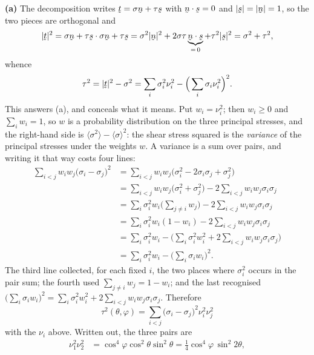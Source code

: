\begin{solution}
\medskip
\noindent\textbf{(a)}
The decomposition  writes $\bt=\sigma\bn+\tau\bs$ with
$\ip\bn\bs=0$ and $|\bs|=|\bn|=1$, so the two pieces are orthogonal and
\[
   |\bt|^{2}=\ip{\sigma\bn+\tau\bs}{\sigma\bn+\tau\bs}
   =\sigma^{2}|\bn|^{2}+2\sigma\tau\underbrace{\ip\bn\bs}_{=\,0}
     +\tau^{2}|\bs|^{2}
   =\sigma^{2}+\tau^{2} ,
\]
whence
\[
   \tau^{2}=|\bt|^{2}-\sigma^{2}
   =\sum_{i}\sigma_{i}^{2}\nu_{i}^{2}
    -\Big(\sum_{i}\sigma_{i}\nu_{i}^{2}\Big)^{2}.
\]
This answers (a), and conceals what it means. Put $w_{i}=\nu_{i}^{2}$;
then $w_{i}\geq0$ and $\sum_{i}w_{i}=1$, so $w$ is a probability
distribution on the three principal stresses, and the right-hand side
is $\langle\sigma^{2}\rangle-\langle\sigma\rangle^{2}$: the shear
stress squared is the \emph{variance} of the principal stresses under
the weights $w$. A variance is a sum over pairs, and writing it that
way costs four lines:
\[
\begin{aligned}
   \sum_{i<j}w_{i}w_{j}\big(\sigma_{i}-\sigma_{j}\big)^{2}
   &=\sum_{i<j}w_{i}w_{j}\big(\sigma_{i}^{2}-2\sigma_{i}\sigma_{j}
     +\sigma_{j}^{2}\big)\\
   &=\sum_{i<j}w_{i}w_{j}\big(\sigma_{i}^{2}+\sigma_{j}^{2}\big)
     -2\sum_{i<j}w_{i}w_{j}\sigma_{i}\sigma_{j}\\
   &=\sum_{i}\sigma_{i}^{2}w_{i}\Big(\sum_{j\neq i}w_{j}\Big)
     -2\sum_{i<j}w_{i}w_{j}\sigma_{i}\sigma_{j}\\
   &=\sum_{i}\sigma_{i}^{2}w_{i}(1-w_{i})
     -2\sum_{i<j}w_{i}w_{j}\sigma_{i}\sigma_{j}\\
   &=\sum_{i}\sigma_{i}^{2}w_{i}
     -\Big(\sum_{i}\sigma_{i}^{2}w_{i}^{2}
       +2\sum_{i<j}w_{i}w_{j}\sigma_{i}\sigma_{j}\Big)\\
   &=\sum_{i}\sigma_{i}^{2}w_{i}
     -\Big(\sum_{i}\sigma_{i}w_{i}\Big)^{2} .
\end{aligned}
\]
The third line collected, for each fixed $i$, the two places where
$\sigma_{i}^{2}$ occurs in the pair sum; the fourth used
$\sum_{j\neq i}w_{j}=1-w_{i}$; and the last recognised
$\big(\sum_{i}\sigma_{i}w_{i}\big)^{2}
=\sum_{i}\sigma_{i}^{2}w_{i}^{2}
+2\sum_{i<j}w_{i}w_{j}\sigma_{i}\sigma_{j}$. Therefore
\[
   \boxed{\ \tau^{2}(\theta,\varphi)
   =\sum_{i<j}\big(\sigma_{i}-\sigma_{j}\big)^{2}
   \nu_{i}^{2}\nu_{j}^{2}\ }
\]
with the $\nu_{i}$ above. Written out, the three pairs are
\[
\begin{aligned}
   \nu_{1}^{2}\nu_{2}^{2}
     &=\cos^{4}\varphi\cos^{2}\theta\sin^{2}\theta
      =\tfrac14\cos^{4}\varphi\,\sin^{2}2\theta,\\

\end{aligned}\]
\end{solution}
